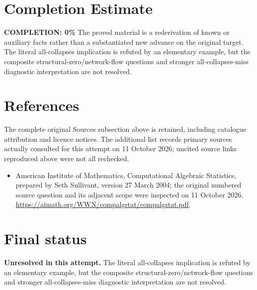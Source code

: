 \documentclass[11pt]{article}
\begin{document}
\section{Completion Estimate}
\noindent\textbf{COMPLETION: 0\%}
The proved material is a rederivation of known or auxiliary facts rather than a substantiated new advance on the original target. The literal all-collapses implication is refuted by an elementary example, but the composite structural-zero/network-flow questions and stronger all-collapses-miss diagnostic interpretation are not resolved.
\section{References}
The complete original Sources subsection above is retained, including catalogue attribution and licence notices. The additional list records primary sources actually consulted for this attempt on 11 October 2026; uncited source links reproduced above were not all rechecked.
\begin{itemize}
\item American Institute of Mathematics, Computational Algebraic Statistics, prepared by Seth Sullivant, version 27 March 2004; the original numbered source question and its adjacent scope were inspected on 11 October 2026. \url{https://aimath.org/WWN/compalgstat/compalgstat.pdf}.
\end{itemize}
\section{Final status}
\textbf{Unresolved in this attempt.} The literal all-collapses implication is refuted by an elementary example, but the composite structural-zero/network-flow questions and stronger all-collapses-miss diagnostic interpretation are not resolved.
\end{document}

